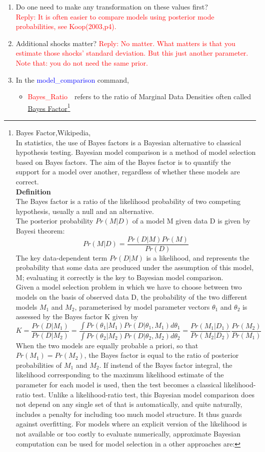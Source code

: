 \documentclass[10pt,math=newtx,citestyle=gb7714-2015,bibstyle=gb7714-2015]{elegantbook}
\begin{document}
{{{\begin{enumerate}
		
		\item Do one need to make any transformation on these values first?\\
		\textcolor{red}{Reply: It is often easier to compare models using posterior mode probabilities, see Koop(2003,p4).}
		
		\item Additional shocks matter?
		\textcolor{red}{Reply: No matter. What matters is that you estimate those shocks' standard deviation. But this just another parameter. Note that: you do not need the same prior.}
		
		\item In the \textcolor{blue}{model\_comparison} command,
		\begin{itemize}
			\item \textcolor{red}{Bayes\_Ratio}~~refers to the ratio of Marginal Data Densities often called \underline{Bayes Factor}\footnote{Bayes Factor,Wikipedia,\\In statistics, the use of Bayes factors is a Bayesian alternative to classical hypothesis testing. Bayesian model comparison is a method of model selection based on Bayes factors. The aim of the Bayes factor is to quantify the support for a model over another, regardless of whether these models are correct.\\
				\textbf{Definition}\\
				The Bayes factor is a ratio of the likelihood probability of two competing hypothesis, usually a null and an alternative.\\
				The posterior probability $Pr(M|D)$ of a model M given data D is given by Bayesi theorem:
				$$Pr(M|D)=\frac{Pr(D|M)Pr(M)}{Pr(D)}$$
				The key data-dependent term $Pr(D|M)$ is a likelihood, and represents the probability that some data are produced under the assumption of this model, M; evaluating it correctly is the key to Bayesian model comparison.\\
				Given a model selection problem in which we have to choose between two models on the basis of observed data D, the probability of the two different models $M_1$ and $M_2$, parameterised by model parameter vectors $\theta_1$ and $\theta_2$ is assessed by the Bayes factor K given by
				$$K=\frac{Pr(D|M_1)}{Pr(D|M_2)}=\frac{\int Pr(\theta_1|M_1)Pr(D|\theta_1,M_1)d\theta_1}{\int Pr(\theta_2|M_2)Pr(D|\theta_2,M_2)d\theta_2}=\frac{Pr(M_1|D_1)}{Pr(M_2|D_2)}\frac{Pr(M_2)}{Pr(M_1)}$$
				When the two models are equally probable a priori, so that $Pr(M_1)=Pr(M_2)$, the Bayes factor is equal to the ratio of posterior probabilities of $M_1$ and $M_2$. If instend of the Bayes factor integral, the likelihood corresponding to the maximum likelihood estimate of the parameter for each model is used, then the test becomes a classical likelihood-ratio test. Unlike a likelihood-ratio test, this Bayesian model comparison does not depend on any single set of that is automatically, and quite naturally, includes a penalty for including too much model structure. It thus guards against overfitting. For models where an explicit version of the likelihood is not available or too costly to evaluate numerically, approximate Bayesian computation can be used for model selection in a other approaches are:
}
\end{itemize}
\end{enumerate}}}}
\end{document}

